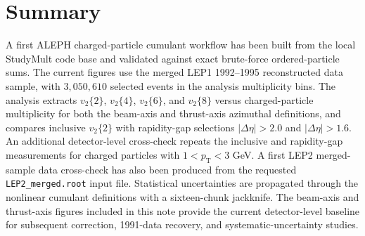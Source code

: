 \documentclass{article}
\newcommand{\pT}{\ensuremath{p_{\mathrm{T}}}}
\newcommand{\vn}[2]{\ensuremath{v_{#1}\{#2\}}}
\begin{document}
\section{Summary}
\label{sec:summary}

A first ALEPH charged-particle cumulant workflow has been built from the local
StudyMult code base and validated against exact brute-force ordered-particle
sums. The current figures use the merged LEP1 1992--1995 reconstructed data
sample, with \(3{,}050{,}610\) selected events in the analysis multiplicity
bins. The analysis extracts \(\vn{2}{2}\), \(\vn{2}{4}\), \(\vn{2}{6}\), and
\(\vn{2}{8}\) versus charged-particle multiplicity for both the beam-axis and
thrust-axis azimuthal definitions, and compares inclusive \(\vn{2}{2}\) with
rapidity-gap selections \(|\Delta\eta|>2.0\) and \(|\Delta\eta|>1.6\).
An additional detector-level cross-check repeats the inclusive and
rapidity-gap measurements for charged particles with \(1<\pT<3\) GeV. A first
LEP2 merged-sample data cross-check has also been produced from the requested
\texttt{LEP2\_merged.root} input file.
Statistical uncertainties are propagated through the nonlinear cumulant
definitions with a sixteen-chunk jackknife. The beam-axis and thrust-axis
figures included in this note provide the current detector-level baseline for
subsequent correction, 1991-data recovery, and systematic-uncertainty studies.



\end{document}
